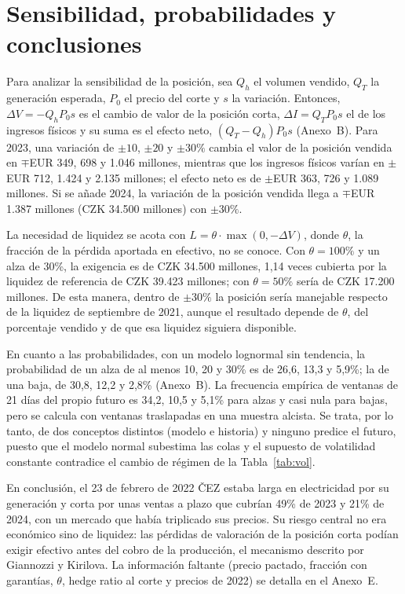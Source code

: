 \documentclass[11pt,letterpaper]{article}
\theoremstyle{plain}
\theoremstyle{definition}
\theoremstyle{remark}
\numberwithin{equation}{section}
\begin{document}
\section{Sensibilidad, probabilidades y conclusiones}\label{sec:sens}

Para analizar la sensibilidad de la posición, sea $Q_h$ el volumen vendido, $Q_T$ la generación esperada, $P_0$ el precio del corte y $s$ la variación. Entonces, $\Delta V=-Q_hP_0s$ es el cambio de valor de la posición corta, $\Delta I=Q_TP_0s$ el de los ingresos físicos y su suma es el efecto neto, $(Q_T-Q_h)P_0s$ (Anexo~B). Para 2023, una variación de $\pm10$, $\pm20$ y $\pm30\%$ cambia el valor de la posición vendida en $\mp$EUR 349, 698 y 1.046 millones, mientras que los ingresos físicos varían en $\pm$EUR 712, 1.424 y 2.135 millones; el efecto neto es de $\pm$EUR 363, 726 y 1.089 millones. Si se añade 2024, la variación de la posición vendida llega a $\mp$EUR 1.387 millones (CZK 34.500 millones) con $\pm30\%$.

La necesidad de liquidez se acota con $L=\theta\cdot\max(0,-\Delta V)$, donde $\theta$, la fracción de la pérdida aportada en efectivo, no se conoce. Con $\theta=100\%$ y un alza de 30\%, la exigencia es de CZK 34.500 millones, 1,14 veces cubierta por la liquidez de referencia de CZK 39.423 millones; con $\theta=50\%$ sería de CZK 17.200 millones. De esta manera, dentro de $\pm30\%$ la posición sería manejable respecto de la liquidez de septiembre de 2021, aunque el resultado depende de $\theta$, del porcentaje vendido y de que esa liquidez siguiera disponible.

En cuanto a las probabilidades, con un modelo lognormal sin tendencia, la probabilidad de un alza de al menos 10, 20 y 30\% es de 26,6, 13,3 y 5,9\%; la de una baja, de 30,8, 12,2 y 2,8\% (Anexo~B). La frecuencia empírica de ventanas de 21 días del propio futuro es 34,2, 10,5 y 5,1\% para alzas y casi nula para bajas, pero se calcula con ventanas traslapadas en una muestra alcista. Se trata, por lo tanto, de dos conceptos distintos (modelo e historia) y ninguno predice el futuro, puesto que el modelo normal subestima las colas y el supuesto de volatilidad constante contradice el cambio de régimen de la Tabla~\ref{tab:vol}.

En conclusión, el 23 de febrero de 2022 ČEZ estaba larga en electricidad por su generación y corta por unas ventas a plazo que cubrían 49\% de 2023 y 21\% de 2024, con un mercado que había triplicado sus precios. Su riesgo central no era económico sino de liquidez: las pérdidas de valoración de la posición corta podían exigir efectivo antes del cobro de la producción, el mecanismo descrito por Giannozzi y Kirilova. La información faltante (precio pactado, fracción con garantías, $\theta$, hedge ratio al corte y precios de 2022) se detalla en el Anexo~E.
\end{document}
